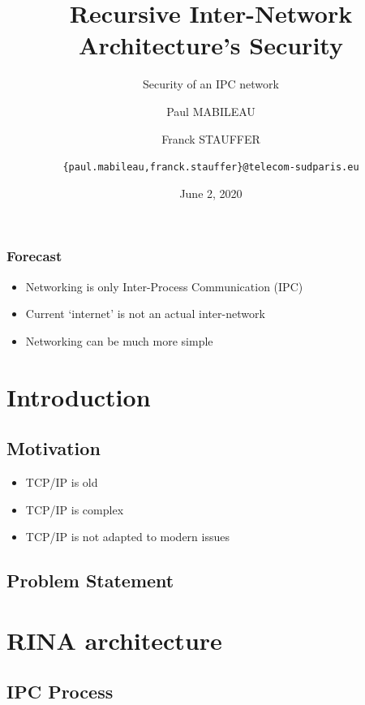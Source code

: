 \documentclass[aspectratio=169]{beamer}
\author[MABILEAU, STAUFFER]{Paul MABILEAU
\and
Franck STAUFFER
\and 
\texttt{\{paul.mabileau,franck.stauffer\}@telecom-sudparis.eu}}
\institute[TSP]{TELECOM SudParis}
\title[RINA's security]{Recursive Inter-Network Architecture's Security}
\subtitle{Security of an IPC network}
\date[2020/06/02]{June 2, 2020}
\begin{document}
\maketitle

\begin{frame}
    \frametitle{Forecast}
    \begin{itemize}
        \item Networking is only Inter-Process Communication (IPC)
        \item Current `internet' is not an actual inter-network
        \item Networking can be much more simple
    \end{itemize}
\end{frame}


\section{Introduction}

\subsection{Motivation}
\begin{frame}
    \begin{itemize}
        \item TCP/IP is old
        \item TCP/IP is complex
        \item TCP/IP is not adapted to modern issues
    \end{itemize}
\end{frame}

\subsection{Problem Statement}

\section{RINA architecture}
\subsection{IPC Process}
\end{document}
